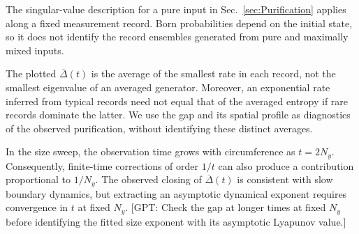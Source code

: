 \documentclass[aps,prb,10pt,twocolumn,superscriptaddress,longbibliography,floatfix]{revtex4-2}
\newcommand{\GPT}[1]{{\color{magenta}[GPT: #1]}}
\begin{document}
{The singular-value description for a pure input in Sec.~\ref{sec:Purification} applies along a fixed measurement record. Born probabilities depend on the initial state, so it does not identify the record ensembles generated from pure and maximally mixed inputs.

The plotted $\overline{\Delta}(t)$ is the average of the smallest rate in each record, not the smallest eigenvalue of an averaged generator. Moreover, an exponential rate inferred from typical records need not equal that of the averaged entropy if rare records dominate the latter. We use the gap and its spatial profile as diagnostics of the observed purification, without identifying these distinct averages.

In the size sweep, the observation time grows with circumference as $t=2N_y$. Consequently, finite-time corrections of order $1/t$ can also produce a contribution proportional to $1/N_y$. The observed closing of $\overline{\Delta}(t)$ is consistent with slow boundary dynamics, but extracting an asymptotic dynamical exponent requires convergence in $t$ at fixed $N_y$.
\GPT{Check the gap at longer times at fixed $N_y$ before identifying the fitted size exponent with its asymptotic Lyapunov value.}
}
\end{document}
